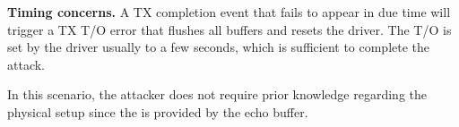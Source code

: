 \noindent\textbf{Timing concerns.} A TX completion event that fails to appear in due time will trigger a TX T/O error that flushes all buffers and resets the driver. The T/O is set by the driver usually to a few seconds, which is sufficient to complete the attack.
 
In this scenario, the attacker does not require prior knowledge regarding the physical setup since the \kva is provided by the echo buffer.  







